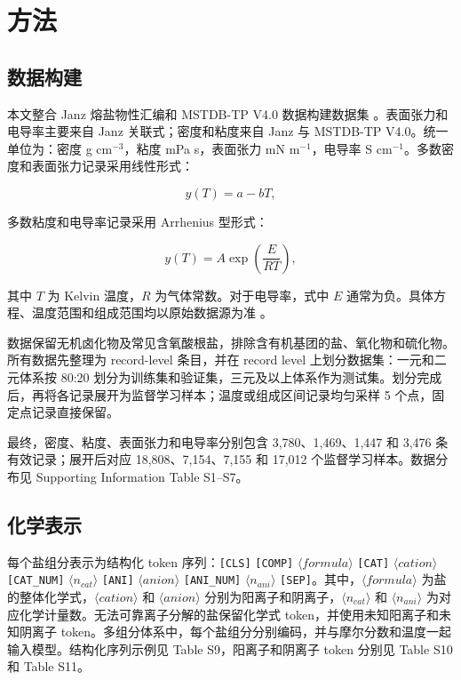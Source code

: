 \documentclass[journal=jctcce,manuscript=article,doi=true]{achemso}
\begin{document}
\section{方法}\label{ux65b9ux6cd5}

\subsection{数据构建}\label{ux6570ux636eux6784ux5efa}

本文整合 Janz 熔盐物性汇编和 MSTDB-TP V4.0 数据构建数据集 \cite{janz1988molten,chesser2025mstdb}。表面张力和电导率主要来自 Janz 关联式；密度和粘度来自 Janz 与 MSTDB-TP V4.0。统一单位为：密度 g cm\(^{-3}\)，粘度 mPa s，表面张力 mN m\(^{-1}\)，电导率 S cm\(^{-1}\)。多数密度和表面张力记录采用线性形式：

\[
y(T)=a-bT,
\tag{1}
\]

多数粘度和电导率记录采用 Arrhenius 型形式：

\[
y(T)=A\exp\left(\frac{E}{RT}\right),
\tag{2}
\]

\noindent 其中 \(T\) 为 Kelvin 温度，\(R\) 为气体常数。对于电导率，式中 \(E\) 通常为负。具体方程、温度范围和组成范围均以原始数据源为准 \cite{janz1988molten,chesser2025mstdb}。

数据保留无机卤化物及常见含氧酸根盐，排除含有机基团的盐、氧化物和硫化物。所有数据先整理为 record-level 条目，并在 record level 上划分数据集：一元和二元体系按 80:20 划分为训练集和验证集，三元及以上体系作为测试集。划分完成后，再将各记录展开为监督学习样本；温度或组成区间记录均匀采样 5 个点，固定点记录直接保留。

最终，密度、粘度、表面张力和电导率分别包含 3,780、1,469、1,447 和 3,476 条有效记录；展开后对应 18,808、7,154、7,155 和 17,012 个监督学习样本。数据分布见 Supporting Information Table S1--S7。

\subsection{化学表示}\label{ux5316ux5b66ux8868ux793a}

每个盐组分表示为结构化 token 序列：\texttt{[CLS]} \texttt{[COMP]} \(\langle formula\rangle\) \texttt{[CAT]} \(\langle cation\rangle\) \texttt{[CAT\_NUM]} \(\langle n_{cat}\rangle\) \texttt{[ANI]} \(\langle anion\rangle\) \texttt{[ANI\_NUM]} \(\langle n_{ani}\rangle\) \texttt{[SEP]}。其中，\(\langle formula\rangle\) 为盐的整体化学式，\(\langle cation\rangle\) 和 \(\langle anion\rangle\) 分别为阳离子和阴离子，\(\langle n_{cat}\rangle\) 和 \(\langle n_{ani}\rangle\) 为对应化学计量数。无法可靠离子分解的盐保留化学式 token，并使用未知阳离子和未知阴离子 token。多组分体系中，每个盐组分分别编码，并与摩尔分数和温度一起输入模型。结构化序列示例见 Table S9，阳离子和阴离子 token 分别见 Table S10 和 Table S11。
\end{document}
